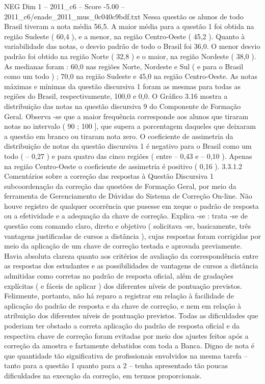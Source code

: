 \begin{textsample}{NEG Dim 1 – 2011\_c6 – Score -5.00 – 2011\_c6/enade\_2011\_mus\_0c040c9bdf.txt}
Nessa questão os alunos de todo Brasil tiveram a nota média 56,5.
A maior média para a questão 1 foi obtida na região Sudeste ( 60,4 ), e a menor, na região Centro-Oeste ( 45,2 ).
Quanto à variabilidade das notas, o desvio padrão de todo o Brasil foi 36,0.
O menor desvio padrão foi obtido na região Norte ( 32,8 ) e o maior, na região Nordeste ( 38,0 ).
As medianas foram : 60,0 nas regiões Norte, Nordeste e Sul ( e para o Brasil como um todo ) ; 70,0 na região Sudeste e 45,0 na região Centro-Oeste.
As notas máximas e mínimas da questão discursiva 1 foram as mesmas para todas as regiões do Brasil, respectivamente, 100,0 e 0,0.
O Gráfico 3.16 mostra a distribuição das notas na questão discursiva 9 do Componente de Formação Geral.
Observa -se que a maior frequência corresponde aos alunos que tiraram notas no intervalo ( 90 ; 100 ], que supera a porcentagem daqueles que deixaram a questão em branco ou tiraram nota zero.
O coeficiente de assimetria da distribuição de notas da questão discursiva 1 é negativo para o Brasil como um todo ( – 0,27 ) e para quatro das cinco regiões ( entre – 0,43 e – 0,10 ).
Apenas na região Centro-Oeste o coeficiente de assimetria é positivo ( 0,16 ). 3.3.1.2 Comentários sobre a correção das respostas à Questão Discursiva 1 subcoordenação da correção das questões de Formação Geral, por meio da ferramenta de Gerenciamento de Dúvidas do Sistema de Correção On-line.
Não houve registro de qualquer ocorrência que pusesse em xeque o padrão de resposta ou a efetividade e a adequação da chave de correção.
Explica -se : trata -se de questão com comando claro, direto e objetivo ( solicitava -se, basicamente, três vantagens justificadas de cursos a distância ), cujas respostas foram corrigidas por meio da aplicação de um chave de correção testada e aprovada previamente.
Havia absoluta clareza quanto aos critérios de avaliação da correspondência entre as respostas dos estudantes e as possibilidades de vantagens de cursos a distância admitidas como corretas no padrão de resposta oficial, além de gradações explícitas ( e fáceis de aplicar ) dos diferentes níveis de pontuação previstos.
Felizmente, portanto, não há reparo a registrar em relação à facilidade de aplicação do padrão de resposta e da chave de correção, e nem em relação à atribuição dos diferentes níveis de pontuação previstos.
Todas as dificuldades que poderiam ter obstado a correta aplicação do padrão de resposta oficial e da respectiva chave de correção foram evitadas por meio dos ajustes feitos após a correção da amostra e fartamente debatidos com toda a Banca.
Digno de nota é que quantidade tão significativa de profissionais envolvidos na mesma tarefa – tanto para a questão 1 quanto para a 2 – tenha apresentado tão poucas dificuldades na execução da correção, em termos proporcionais.

\end{textsample}
